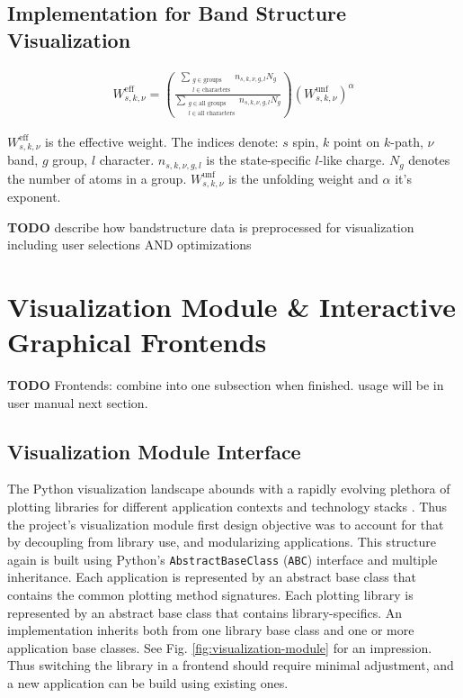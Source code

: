 \subsection{Implementation for Band Structure Visualization}
\label{sec:preprocessor-implementation}

\begin{align}
  W^{\text{eff}}_{s,k,\nu} = \left( \frac{\sum\limits_{\substack{g \in \text{groups} \\ l \in \text{characters}}} n_{s,k,\nu,g,l} N_g}{\sum\limits_{\substack{g \in \text{all groups} \\ l \in \text{all characters}}} n_{s,k,\nu,g,l} N_g} \right) \left(W_{s,k,\nu}^{\text{unf}}\right)^\alpha
\end{align}

\(W^{\text{eff}}_{s,k,\nu}\) is the effective weight. The indices denote: \(s\)
spin, \(k\) point on \(k\)-path, \(\nu\) band, \(g\) group, \(l\) character.
\(n_{s,k,\nu,g,l}\) is the state-specific \(l\)-like charge. \(N_g\) denotes the
number of atoms in a group. \(W_{s,k,\nu}^{\text{unf}}\) is the unfolding weight
and \(\alpha\) it's exponent.


\textbf{TODO} describe how bandstructure data is preprocessed for visualization
including user selections AND optimizations

\section{Visualization Module \& Interactive Graphical Frontends}
\label{sec:visualization-module}

\textbf{TODO} Frontends: combine into one subsection when finished. usage will
be in user manual next section.

\subsection{Visualization Module Interface}
\label{sec:visualization-interface}

The Python visualization landscape abounds with a rapidly evolving plethora of
plotting libraries for different application contexts and technology stacks
\cite{python-visualization}. Thus the project's visualization module first
design objective was to account for that by decoupling from library use, and
modularizing applications. This structure again is built using Python's
\texttt{AbstractBaseClass} (\texttt{ABC}) interface and multiple inheritance.
Each application is represented by an abstract base class that contains the
common plotting method signatures. Each plotting library is represented by an
abstract base class that contains library-specifics. An implementation inherits
both from one library base class and one or more application base classes. See
Fig. \ref{fig:visualization-module} for an impression. Thus switching the
library in a frontend should require minimal adjustment, and a new application
can be build using existing ones.

